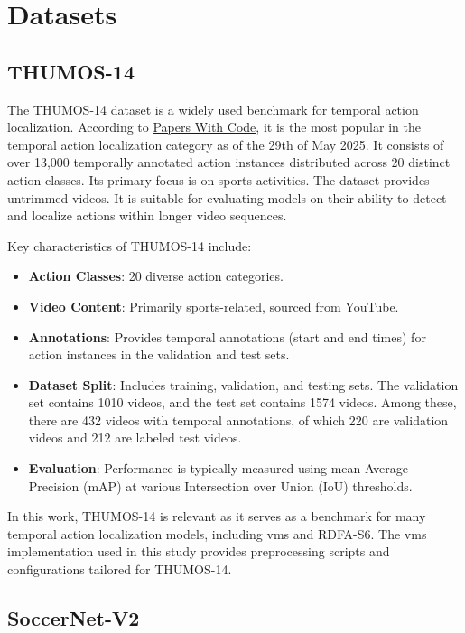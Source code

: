 \section{Datasets}
\label{sec:method_datasets}

\subsection{THUMOS-14}
\label{ssec:method_thumos14}
The THUMOS-14 dataset \cite{dataset:thumos} is a widely used benchmark for temporal action localization. According to \hyperlink{https://paperswithcode.com/dataset/thumos14-1}{Papers With Code}, it is the most popular in the temporal action localization category as of the 29th of May 2025. It consists of over 13,000 temporally annotated action instances distributed across 20 distinct action classes. Its primary focus is on sports activities. The dataset provides untrimmed videos. It is suitable for evaluating models on their ability to detect and localize actions within longer video sequences. 

Key characteristics of THUMOS-14 include:
\begin{itemize}
    \item \textbf{Action Classes}: 20 diverse action categories.
    \item \textbf{Video Content}: Primarily sports-related, sourced from YouTube.
    \item \textbf{Annotations}: Provides temporal annotations (start and end times) for action instances in the validation and test sets.
    \item \textbf{Dataset Split}: Includes training, validation, and testing sets. The validation set contains 1010 videos, and the test set contains 1574 videos. Among these, there are 432 videos with temporal annotations, of which 220 are validation videos and 212 are labeled test videos. 
    \item \textbf{Evaluation}: Performance is typically measured using mean Average Precision (mAP) at various Intersection over Union (IoU) thresholds.
\end{itemize}

In this work, THUMOS-14 is relevant as it serves as a benchmark for many temporal action localization models, including \acrshort{vms} and RDFA-S6. The \acrshort{vms} implementation used in this study provides preprocessing scripts and configurations tailored for THUMOS-14.

\subsection{SoccerNet-V2}
\label{ssec:dataset_soccernet}

